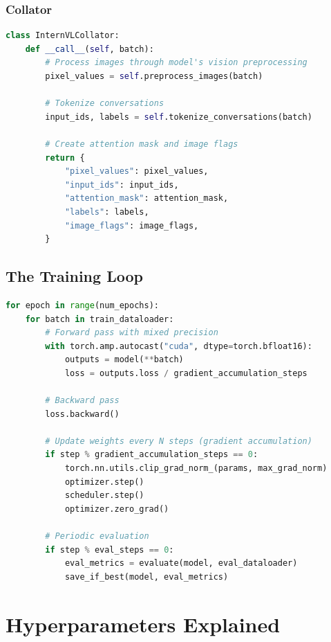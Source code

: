 \documentclass[11pt,a4paper]{article}
\begin{document}
\subsubsection{Collator}
\begin{lstlisting}[language=Python,caption=Collator implementation]
class InternVLCollator:
    def __call__(self, batch):
        # Process images through model's vision preprocessing
        pixel_values = self.preprocess_images(batch)
        
        # Tokenize conversations
        input_ids, labels = self.tokenize_conversations(batch)
        
        # Create attention mask and image flags
        return {
            "pixel_values": pixel_values,
            "input_ids": input_ids,
            "attention_mask": attention_mask,
            "labels": labels,
            "image_flags": image_flags,
        }
\end{lstlisting}

\subsection{The Training Loop}

\begin{lstlisting}[language=Python,caption=Training loop pseudocode]
for epoch in range(num_epochs):
    for batch in train_dataloader:
        # Forward pass with mixed precision
        with torch.amp.autocast("cuda", dtype=torch.bfloat16):
            outputs = model(**batch)
            loss = outputs.loss / gradient_accumulation_steps
        
        # Backward pass
        loss.backward()
        
        # Update weights every N steps (gradient accumulation)
        if step % gradient_accumulation_steps == 0:
            torch.nn.utils.clip_grad_norm_(params, max_grad_norm)
            optimizer.step()
            scheduler.step()
            optimizer.zero_grad()
        
        # Periodic evaluation
        if step % eval_steps == 0:
            eval_metrics = evaluate(model, eval_dataloader)
            save_if_best(model, eval_metrics)
\end{lstlisting}

\section{Hyperparameters Explained}
\end{document}
